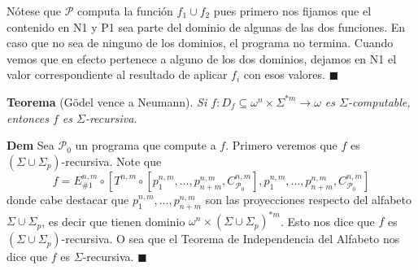 \documentclass{article}
\begin{document}
Nótese que $\mathcal{P}$ computa la función $f_1 \cup f_2$ pues primero nos fijamos que el contenido en N1 y P1 sea parte del dominio de algunas de las dos funciones. En caso que no sea de ninguno de los dominios, el programa no termina. Cuando vemos que en efecto pertenece a alguno de los dos dominios, dejamos en N1 el valor correspondiente al resultado de aplicar $f_i$ con esos valores. \hfill $\blacksquare$



\bigskip
\bigskip

\textbf{Teorema} (Gödel vence a Neumann). \textit{Si $f : D_f \subseteq \omega^n \times \Sigma^{*m} \to \omega$ es $\Sigma$-computable, entonces $f$ es $\Sigma$-recursiva.}
\bigskip

\textbf{Dem} Sea $\mathcal{P}_0$ un programa que compute a $f$. Primero veremos que $f$ es $(\Sigma \cup \Sigma_p)$-recursiva. Note que
\[
f = E^{n,m}_{\#1} \circ [T^{n,m} \circ [p^{n,m}_{1}, \ldots, p^{n,m}_{n+m}, C^{n,m}_{\mathcal{P}_0}], p^{n,m}_{1}, \ldots, p^{n,m}_{n+m}, C^{n,m}_{\mathcal{P}_0}]
\]
donde cabe destacar que $p^{n,m}_{1}, \ldots, p^{n,m}_{n+m}$ son las proyecciones respecto del alfabeto $\Sigma \cup \Sigma_p$, es decir que tienen dominio $\omega^n \times (\Sigma \cup \Sigma_p)^{*m}$. Esto nos dice que $f$ es $(\Sigma \cup \Sigma_p)$-recursiva. O sea que el Teorema de Independencia del Alfabeto nos dice que $f$ es $\Sigma$-recursiva.
\hfill $\blacksquare$
\end{document}
